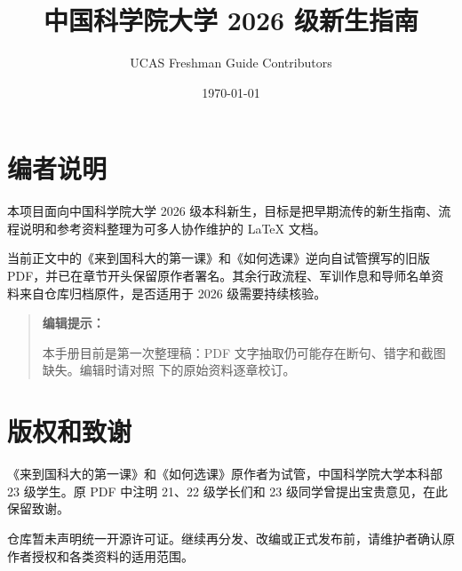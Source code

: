 \documentclass[UTF8,oneside,openany,zihao=-4]{ctexbook}
\title{中国科学院大学 2026 级新生指南}
\author{UCAS Freshman Guide Contributors}
\date{\today}
\newenvironment{editingnote}{%
  \par\smallskip
  \begin{quote}
    \small\color{black!75}\textbf{编辑提示：}
}{%
  \end{quote}
  \par\smallskip
}
\begin{document}
\frontmatter
\maketitle

\chapter*{编者说明}
本项目面向中国科学院大学 2026 级本科新生，目标是把早期流传的新生指南、流程说明和参考资料整理为可多人协作维护的 \LaTeX{} 文档。

当前正文中的《来到国科大的第一课》和《如何选课》逆向自试管撰写的旧版 PDF，并已在章节开头保留原作者署名。其余行政流程、军训作息和导师名单资料来自仓库归档原件，是否适用于 2026 级需要持续核验。

\begin{editingnote}
本手册目前是第一次整理稿：PDF 文字抽取仍可能存在断句、错字和截图缺失。编辑时请对照  下的原始资料逐章校订。
\end{editingnote}

\tableofcontents

\mainmatter




\appendix



\backmatter
\chapter*{版权和致谢}
《来到国科大的第一课》和《如何选课》原作者为试管，中国科学院大学本科部 23 级学生。原 PDF 中注明 21、22 级学长们和 23 级同学曾提出宝贵意见，在此保留致谢。

仓库暂未声明统一开源许可证。继续再分发、改编或正式发布前，请维护者确认原作者授权和各类资料的适用范围。
\end{document}
